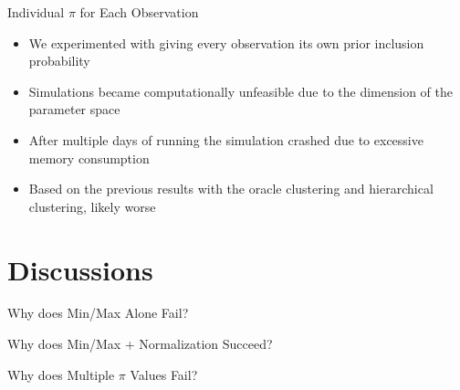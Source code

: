 \documentclass[
  ignorenonframetext,
]{beamer}
\begin{document}
\begin{frame}{Individual \(\pi\) for Each Observation}
\protect\hypertarget{individual-pi-for-each-observation}{}
\begin{itemize}
\item
  We experimented with giving every observation its own prior inclusion
  probability
\item
  Simulations became computationally unfeasible due to the dimension of
  the parameter space
\item
  After multiple days of running the simulation crashed due to excessive
  memory consumption
\item
  Based on the previous results with the oracle clustering and
  hierarchical clustering, likely worse
\end{itemize}

\end{frame}

\hypertarget{discussions}{%
\section{Discussions}\label{discussions}}

\begin{frame}{Why does Min/Max Alone Fail?}
\protect\hypertarget{why-does-minmax-alone-fail}{}
\end{frame}

\begin{frame}{Why does Min/Max + Normalization Succeed?}
\protect\hypertarget{why-does-minmax-normalization-succeed}{}
\end{frame}

\begin{frame}{Why does Multiple \(\pi\) Values Fail?}
\protect\hypertarget{why-does-multiple-pi-values-fail}{}
\end{frame}
\end{document}
